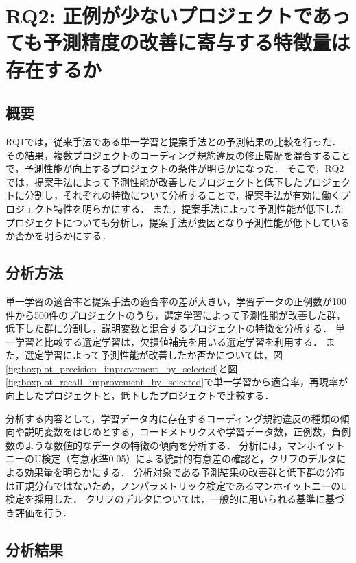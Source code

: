 \documentclass[11pt]{jreport}
\begin{document}
\chapter{RQ2: 正例が少ないプロジェクトであっても予測精度の改善に寄与する特徴量は存在するか}\label{chap:rq2}



\section{概要}

RQ1では，従来手法である単一学習と提案手法との予測結果の比較を行った．
その結果，複数プロジェクトのコーディング規約違反の修正履歴を混合することで，予測性能が向上するプロジェクトの条件が明らかになった．
そこで，RQ2では，提案手法によって予測性能が改善したプロジェクトと低下したプロジェクトに分割し，それぞれの特徴について分析することで，提案手法が有効に働くプロジェクト特性を明らかにする．
また，提案手法によって予測性能が低下したプロジェクトについても分析し，提案手法が要因となり予測性能が低下しているか否かを明らかにする．

\section{分析方法}

単一学習の適合率と提案手法の適合率の差が大きい，学習データの正例数が100件から500件のプロジェクトのうち，選定学習によって予測性能が改善した群，低下した群に分割し，説明変数と混合するプロジェクトの特徴を分析する．
単一学習と比較する選定学習は，欠損値補完を用いる選定学習を利用する．
また，選定学習によって予測性能が改善したか否かについては，図\ref{fig:boxplot_precision_improvement_by_selected}と図\ref{fig:boxplot_recall_improvement_by_selected}で単一学習から適合率，再現率が向上したプロジェクトと，低下したプロジェクトで比較する．

分析する内容として，学習データ内に存在するコーディング規約違反の種類の傾向や説明変数をはじめとする，コードメトリクスや学習データ数，正例数，負例数のような数値的なデータの特徴の傾向を分析する．
分析には，マンホイットニーのU検定（有意水準0.05）による統計的有意差の確認と，クリフのデルタによる効果量を明らかにする．
分析対象である予測結果の改善群と低下群の分布は正規分布ではないため，ノンパラメトリック検定であるマンホイットニーのU検定を採用した．
クリフのデルタについては，一般的に用いられる基準に基づき評価を行う\cite{romano2006appropriate}．

\section{分析結果}
\end{document}
